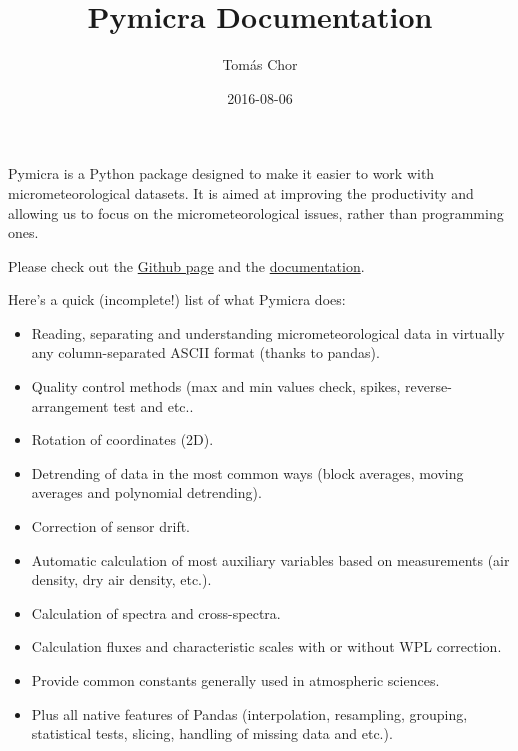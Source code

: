\documentclass[a4paper,10pt,oneside]{sphinxmanual}
\title{Pymicra Documentation}
\date{2016-08-06}
\author{Tomás Chor}
\begin{document}
\maketitle
\tableofcontents
{}\label{index::doc}


Pymicra is a Python package designed to make it easier to work with
micrometeorological datasets. It is aimed at improving the productivity and
allowing us to focus on the micrometeorological issues, rather than programming
ones.

Please check out the \href{https://github.com/tomchor/pymicra}{Github page} and the \href{https://tomchor.github.io/pymicra}{documentation}.

Here's a quick (incomplete!) list of what Pymicra does:
\begin{itemize}
\item {} 
Reading, separating and understanding micrometeorological data in
virtually any column-separated ASCII format (thanks to pandas).

\item {} 
Quality control methods (max and min values check, spikes,
reverse-arrangement test and etc..

\item {} 
Rotation of coordinates (2D).

\item {} 
Detrending of data in the most common ways (block averages, moving
averages and polynomial detrending).

\item {} 
Correction of sensor drift.

\item {} 
Automatic calculation of most auxiliary variables based on
measurements (air density, dry air density, etc.).

\item {} 
Calculation of spectra and cross-spectra.

\item {} 
Calculation fluxes and characteristic scales with or without WPL correction.

\item {} 
Provide common constants generally used in atmospheric sciences.

\item {} 
Plus all native features of Pandas (interpolation, resampling,
grouping, statistical tests, slicing, handling of missing data and
etc.).

\end{itemize}
\end{document}

